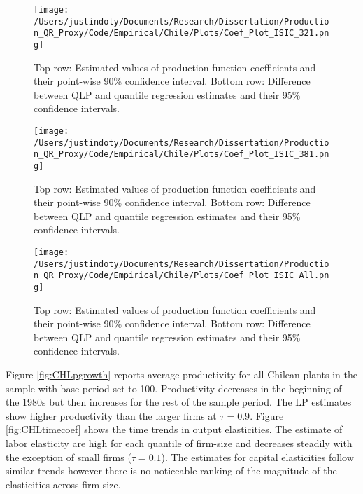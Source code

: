 \documentclass[11pt]{article}
\begin{document}
\begin{figure}[H]
\centering
\texttt{[image: /Users/justindoty/Documents/Research/Dissertation/Production\_QR\_Proxy/Code/Empirical/Chile/Plots/Coef\_Plot\_ISIC\_321.png]}
\caption{Top row: Estimated values of production function coefficients and their point-wise 90\% confidence interval. Bottom row: Difference between QLP and quantile regression estimates and their 95\% confidence intervals.}
\label{fig:CHL321}
\end{figure}

\begin{figure}[H]
\centering
\texttt{[image: /Users/justindoty/Documents/Research/Dissertation/Production\_QR\_Proxy/Code/Empirical/Chile/Plots/Coef\_Plot\_ISIC\_381.png]}
\caption{Top row: Estimated values of production function coefficients and their point-wise 90\% confidence interval. Bottom row: Difference between QLP and quantile regression estimates and their 95\% confidence intervals.}
\label{fig:CHL381}
\end{figure}

\begin{figure}[H]
\centering
\texttt{[image: /Users/justindoty/Documents/Research/Dissertation/Production\_QR\_Proxy/Code/Empirical/Chile/Plots/Coef\_Plot\_ISIC\_All.png]}
\caption{Top row: Estimated values of production function coefficients and their point-wise 90\% confidence interval. Bottom row: Difference between QLP and quantile regression estimates and their 95\% confidence intervals.}
\label{fig:CHLall}
\end{figure}



Figure \ref{fig:CHLpgrowth} reports average productivity for all Chilean plants in the sample with base period set to 100. Productivity decreases in the beginning of the 1980s but then increases for the rest of the sample period. The LP estimates show higher productivity than the larger firms at $\tau=0.9$. Figure \ref{fig:CHLtimecoef} shows the time trends in output elasticities. The estimate of labor elasticity are high for each quantile of firm-size and decreases steadily with the exception of small firms ($\tau=0.1$). The estimates for capital elasticities follow similar trends however there is no noticeable ranking of the magnitude of the elasticities across firm-size. 
\end{document}
